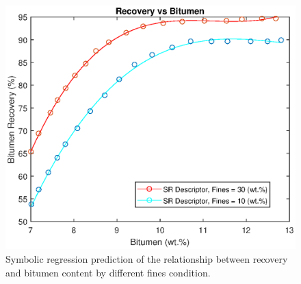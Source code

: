 \documentclass[final,5p,times,twocolumn]{elsarticle}
\begin{document}
\begin{figure}[!hptb]
	\centering
	\includegraphics[width=\linewidth,clip]{NIRS_BITUMEN_COMPAIR.eps}
	\caption{Symbolic regression prediction of the relationship between recovery and bitumen content by different fines condition.}
	\label{fig:NIRS_BITUMEN_COMPAIR}
\end{figure}
\end{document}
